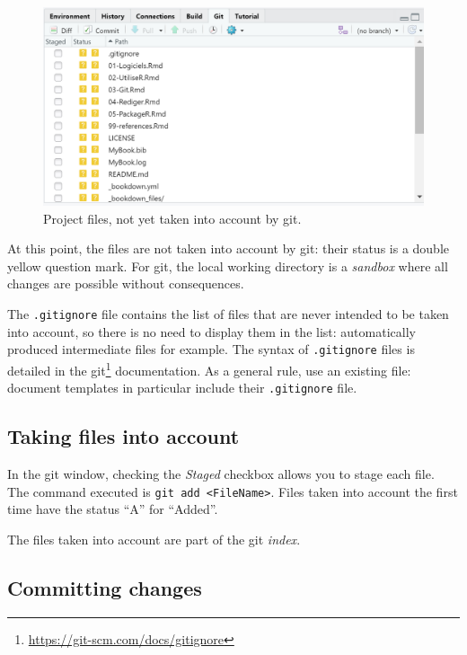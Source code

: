 \documentclass[
  12pt,
  american,
  a4paper,
  extrafontsizes,onecolumn,openright
  ]{memoir}
\begin{document}
\begin{figure}

{\centering \includegraphics[width=0.8\linewidth]{images/git-Fichiers} 

}

\caption{Project files, not yet taken into account by git.}\label{fig:git-Fichiers}
\end{figure}

\normalsize

At this point, the files are not taken into account by git: their status is a double yellow question mark.
For git, the local working directory is a \emph{sandbox} where all changes are possible without consequences.

The \texttt{.gitignore} file contains the list of files that are never intended to be taken into account, so there is no need to display them in the list: automatically produced intermediate files for example.
The syntax of \texttt{.gitignore} files is detailed in the git\footnote{\url{https://git-scm.com/docs/gitignore}} documentation.
As a general rule, use an existing file: document templates in particular include their \texttt{.gitignore} file.

\hypertarget{taking-files-into-account}{%
\subsection{Taking files into account}\label{taking-files-into-account}}

In the git window, checking the \emph{Staged} checkbox allows you to stage each file.
The command executed is \texttt{git\ add\ \textless{}FileName\textgreater{}}.
Files taken into account the first time have the status \enquote{A} for \enquote{Added}.

The files taken into account are part of the git \emph{index}.

\hypertarget{committing-changes}{%
\subsection{Committing changes}\label{committing-changes}}
\end{document}
